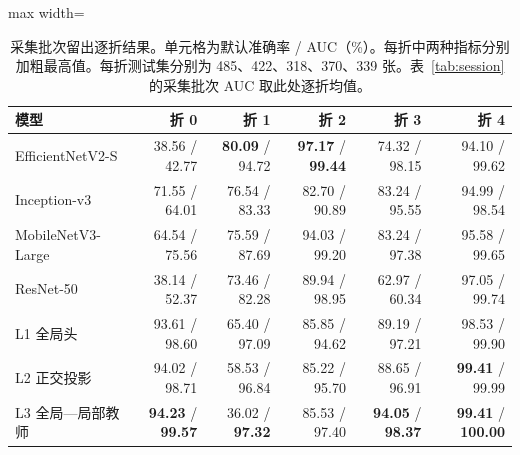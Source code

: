 \begin{table}[htbp]
\centering\small
\caption{采集批次留出逐折结果。单元格为默认准确率 / AUC（\%）。每折中两种指标分别加粗最高值。每折测试集分别为 485、422、318、370、339 张。表~\ref{tab:session} 的采集批次 AUC 取此处逐折均值。}
\label{tab:perfold}
\begin{adjustbox}{max width=\linewidth}
\begin{tabular}{lrrrrr}
\toprule
模型 & 折 0 & 折 1 & 折 2 & 折 3 & 折 4\\
\midrule
EfficientNetV2-S & 38.56 / 42.77 & \textbf{80.09} / 94.72 & \textbf{97.17} / \textbf{99.44} & 74.32 / 98.15 & 94.10 / 99.62\\
Inception-v3 & 71.55 / 64.01 & 76.54 / 83.33 & 82.70 / 90.89 & 83.24 / 95.55 & 94.99 / 98.54\\
MobileNetV3-Large & 64.54 / 75.56 & 75.59 / 87.69 & 94.03 / 99.20 & 83.24 / 97.38 & 95.58 / 99.65\\
ResNet-50 & 38.14 / 52.37 & 73.46 / 82.28 & 89.94 / 98.95 & 62.97 / 60.34 & 97.05 / 99.74\\
L1 全局头 & 93.61 / 98.60 & 65.40 / 97.09 & 85.85 / 94.62 & 89.19 / 97.21 & 98.53 / 99.90\\
L2 正交投影 & 94.02 / 98.71 & 58.53 / 96.84 & 85.22 / 95.70 & 88.65 / 96.91 & \textbf{99.41} / 99.99\\
L3 全局—局部教师 & \textbf{94.23} / \textbf{99.57} & 36.02 / \textbf{97.32} & 85.53 / 97.40 & \textbf{94.05} / \textbf{98.37} & \textbf{99.41} / \textbf{100.00}\\
\bottomrule
\end{tabular}
\end{adjustbox}
\end{table}

